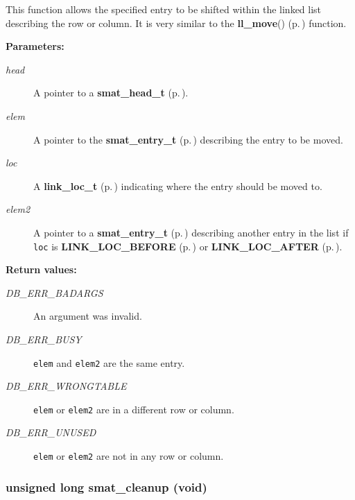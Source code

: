  This function allows the specified entry to be shifted within the linked list describing the row or column. It is very similar to the {\bf ll\_\-move}() {\rm (p.\,\pageref{group__dbprim__link_a7})} function.\begin{Desc}
\item[{\bf Parameters: }]\par
\begin{description}
\item[
{\em head}]A pointer to a {\bf smat\_\-head\_\-t} {\rm (p.\,\pageref{group__dbprim__smat_a1})}. \item[
{\em elem}]A pointer to the {\bf smat\_\-entry\_\-t} {\rm (p.\,\pageref{group__dbprim__smat_a2})} describing the entry to be moved. \item[
{\em loc}]A {\bf link\_\-loc\_\-t} {\rm (p.\,\pageref{group__dbprim__link_a4})} indicating where the entry should be moved to. \item[
{\em elem2}]A pointer to a {\bf smat\_\-entry\_\-t} {\rm (p.\,\pageref{group__dbprim__smat_a2})} describing another entry in the list if {\tt loc} is {\bf LINK\_\-LOC\_\-BEFORE} {\rm (p.\,\pageref{group__dbprim__link_a26a100})} or {\bf LINK\_\-LOC\_\-AFTER} {\rm (p.\,\pageref{group__dbprim__link_a26a101})}.\end{description}
\end{Desc}
\begin{Desc}
\item[{\bf Return values: }]\par
\begin{description}
\item[
{\em DB\_\-ERR\_\-BADARGS}]An argument was invalid. \item[
{\em DB\_\-ERR\_\-BUSY}]{\tt elem} and {\tt elem2} are the same entry. \item[
{\em DB\_\-ERR\_\-WRONGTABLE}]{\tt elem} or {\tt elem2} are in a different row or column. \item[
{\em DB\_\-ERR\_\-UNUSED}]{\tt elem} or {\tt elem2} are not in any row or column. \end{description}
\end{Desc}
\subsubsection{\setlength{\rightskip}{0pt plus 5cm}unsigned long smat\_\-cleanup (void)}\label{group__dbprim__smat_a7}




